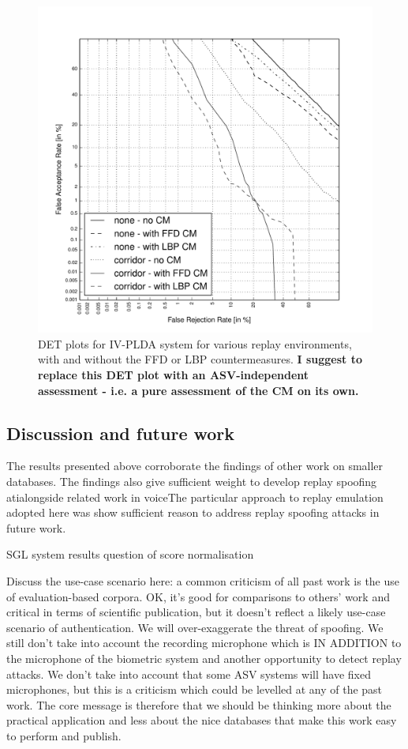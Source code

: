 \begin{figure}
	\centering
\includegraphics[width=1\linewidth]{Figs/DET_IVPLDA_counter_iPad.pdf}
	\caption{DET plots for IV-PLDA system for various replay environments, with and without the FFD or LBP countermeasures. {\bfseries  I suggest to replace this DET plot with an ASV-independent assessment - i.e. a pure assessment of the CM on its own.}}
	\label{fig::DETs_CM}
\end{figure}



\subsection{Discussion and future work}

The results presented above corroborate the findings of other work on smaller databases.  The findings also give sufficient weight to develop replay spoofing atialongside related work in voiceThe particular approach to replay emulation adopted here was show sufficient reason to address replay spoofing attacks in future work.  

SGL system results
question of score normalisation

Discuss the use-case scenario here: a common criticism of all past work is the use of evaluation-based corpora.  OK, it's good for comparisons to others' work and critical in terms of scientific publication, but it doesn't reflect a likely use-case scenario of authentication.  We will over-exaggerate the threat of spoofing.  We still don't take into account the recording microphone which is IN ADDITION to the microphone of the biometric system and another opportunity to detect replay attacks.  We don't take into account that some ASV systems will have fixed microphones, but this is a criticism which could be levelled at any of the past work.  The core message is therefore that we should be thinking more about the practical application and less about the nice databases that make this work easy to perform and publish.


